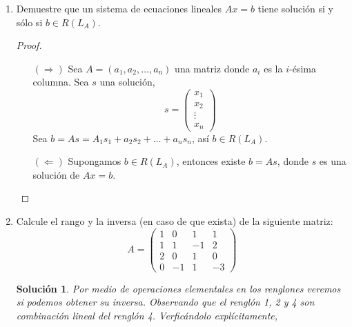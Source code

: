\documentclass[letterpaper]{article}
\newtheorem*{sol}{Solución}
\begin{document}
\begin{enumerate}
\begin{enumerate}[label=(\alph*)]
    \item Sea $C$ una matriz obtenida a partir de $A$ al multiplicar por $c \in F$ un renglón. Muestre que
    $\det(C) = c \cdot \det(A)$.
    \begin{proof}
    TODO\footnote{No me dio tiempo porque tenía otras tareas.}
    \end{proof}
\end{enumerate}

\item Demuestre que un sistema de ecuaciones lineales $Ax = b$ tiene solución si y sólo si $b \in R(L_A)$.
\begin{proof}
\hfill
\begin{itemize}
    \item[$(\Longrightarrow)$] Sea $A = (a_1, a_2, \ldots, a_n)$ una matriz donde $a_i$ es la $i$-ésima columna. Sea
    $s$ una solución,
    \[
        s =
        \begin{pmatrix}
            x_1\\
            x_2\\
            \vdots\\
            x_n
        \end{pmatrix}
    \]
    Sea $b = As = A_1s_1 + a_2s_2 + \ldots + a_ns_n$, así $b \in R(L_A)$.

    \item[$(\Longleftarrow)$] Supongamos $b \in R(L_A)$, entonces existe $b = As$, donde $s$ es una solución de
    $Ax = b$.
\end{itemize}
\end{proof}

\item Calcule el rango y la inversa (en caso de que exista) de la siguiente matriz:
\[
    A = 
    \begin{pmatrix}
    1 & 0  & 1  & 1\\ 
    1 & 1  & -1 & 2\\ 
    2 & 0  & 1  & 0\\ 
    0 & -1 & 1  & -3
    \end{pmatrix}
\]

\begin{sol}
Por medio de operaciones elementales en los renglones veremos si podemos obtener su inversa. Observando que
el renglón 1, 2 y 4 son combinación lineal del renglón 4. Verficándolo explícitamente,


\end{sol}
\end{enumerate}
\end{document}

